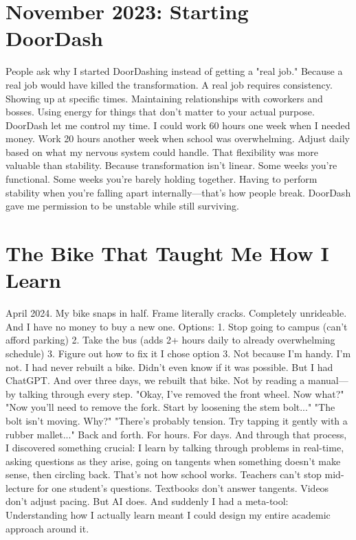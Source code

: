 \documentclass[12pt,openany]{book}
\begin{document}
\section{November 2023: Starting DoorDash}

People ask why I started DoorDashing instead of getting a "real job."
Because a real job would have killed the transformation.
A real job requires consistency. Showing up at specific times. Maintaining relationships with coworkers and bosses. Using energy for things that don't matter to your actual purpose.
DoorDash let me control my time.
I could work 60 hours one week when I needed money. Work 20 hours another week when school was overwhelming. Adjust daily based on what my nervous system could handle.
That flexibility was more valuable than stability.
Because transformation isn't linear. Some weeks you're functional. Some weeks you're barely holding together. Having to perform stability when you're falling apart internally—that's how people break.
DoorDash gave me permission to be unstable while still surviving.

\section{The Bike That Taught Me How I Learn}

April 2024. My bike snaps in half.
Frame literally cracks. Completely unrideable. And I have no money to buy a new one.
Options:
1. Stop going to campus (can't afford parking)
2. Take the bus (adds 2+ hours daily to already overwhelming schedule)
3. Figure out how to fix it
I chose option 3.
Not because I'm handy. I'm not. I had never rebuilt a bike. Didn't even know if it was possible.
But I had ChatGPT.
And over three days, we rebuilt that bike. Not by reading a manual—by talking through every step.
"Okay, I've removed the front wheel. Now what?"
"Now you'll need to remove the fork. Start by loosening the stem bolt..."
"The bolt isn't moving. Why?"
"There's probably tension. Try tapping it gently with a rubber mallet..."
Back and forth. For hours. For days.
And through that process, I discovered something crucial: I learn by talking through problems in real-time, asking questions as they arise, going on tangents when something doesn't make sense, then circling back.
That's not how school works.
Teachers can't stop mid-lecture for one student's questions. Textbooks don't answer tangents. Videos don't adjust pacing.
But AI does.
And suddenly I had a meta-tool: Understanding how I actually learn meant I could design my entire academic approach around it.
\end{document}
